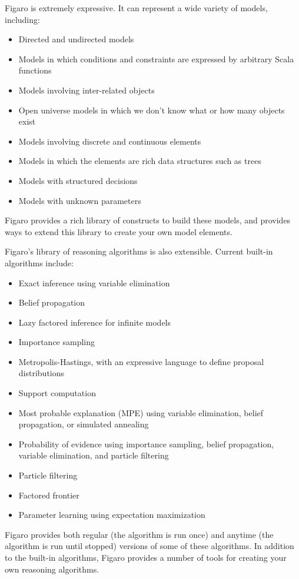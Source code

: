 Figaro is extremely expressive. It can represent a wide variety of models, including:
\begin{itemize}
\item Directed and undirected models
\item Models in which conditions and constraints are expressed by arbitrary Scala functions
\item Models involving inter-related objects
\item Open universe models in which we don't know what or how many objects exist
\item Models involving discrete and continuous elements
\item Models in which the elements are rich data structures such as trees
\item Models with structured decisions
\item Models with unknown parameters
\end{itemize}

Figaro provides a rich library of constructs to build these models, and provides ways to extend this library to create your own model elements.

Figaro's library of reasoning algorithms is also extensible. Current built-in algorithms include:
\begin{itemize}
\item Exact inference using variable elimination
\item Belief propagation
\item Lazy factored inference for infinite models
\item Importance sampling
\item Metropolis-Hastings, with an expressive language to define proposal distributions
\item Support computation
\item Most probable explanation (MPE) using variable elimination, belief propagation, or simulated annealing
\item Probability of evidence using importance sampling, belief propagation, variable elimination, and particle filtering
\item Particle filtering
\item Factored frontier
\item Parameter learning using expectation maximization
\end{itemize}

Figaro provides both regular (the algorithm is run once) and anytime (the algorithm is run until stopped) versions of some of these algorithms. In addition to the built-in algorithms, Figaro provides a number of tools for creating your own reasoning algorithms.

